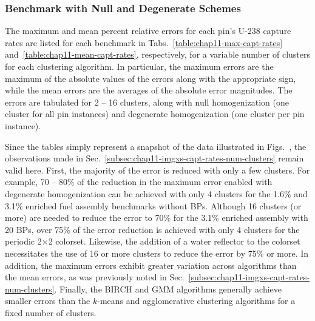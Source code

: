 \clearpage

\subsubsection{Benchmark with Null and Degenerate Schemes}
\label{subsec:chap11-imgxs-capt-rates-benchmark}

The maximum and mean percent relative errors for each pin's U-238 capture rates are listed for each benchmark in Tabs.~\ref{table:chap11-max-capt-rates} and~\ref{table:chap11-mean-capt-rates}, respectively, for a variable number of clusters for each clustering algorithm. In particular, the maximum errors are the maximum of the absolute values of the errors along with the appropriate sign, while the mean errors are the averages of the absolute error magnitudes. The errors are tabulated for 2 -- 16 clusters, along with null homogenization (one cluster for all pin instances) and degenerate homogenization (one cluster per pin instance).

Since the tables simply represent a snapshot of the data illustrated in Figs.~, the observations made in Sec.~\ref{subsec:chap11-imgxs-capt-rates-num-clusters} remain valid here. First, the majority of the error is reduced with only a few clusters. For example, 70 -- 80\% of the reduction in the maximum error enabled with degenerate homogenization can be achieved with only 4 clusters for the 1.6\% and 3.1\% enriched fuel assembly benchmarks without \acp{BP}. Although 16 clusters (or more) are needed to reduce the error to 70\% for the 3.1\% enriched assembly with 20 \acp{BP}, over 75\% of the error reduction is achieved with only 4 clusters for the periodic 2$\times$2 colorset. Likewise, the addition of a water reflector to the colorset necessitates the use of 16 or more clusters to reduce the error by 75\% or more. In addition, the maximum errors exhibit greater variation across algorithms than the mean errors, as was previously noted in Sec.~\ref{subsec:chap11-imgxs-capt-rates-num-clusters}. Finally, the BIRCH and \ac{GMM} algorithms generally achieve smaller errors than the $k$-means and agglomerative clustering algorithms for a fixed number of clusters.

